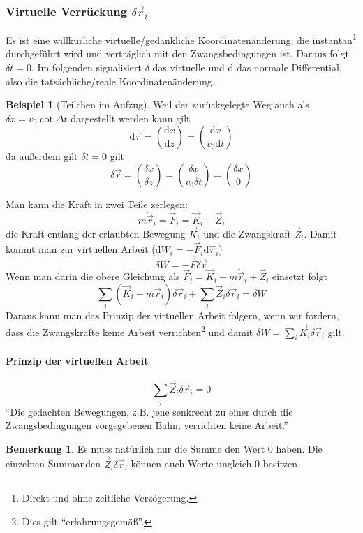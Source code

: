 \documentclass[oneside]{book}
\theoremstyle{definition}
\newtheorem*{bemerkung*}{Bemerkung}
\newtheorem*{beispiel*}{Beispiel}
\newcommand{\conseq}{$\rightarrow$~}
\renewcommand{\d}{\mathrm d}
\newcommand{\rvec}{\vec{r}}
\newcommand{\ddotvec}[1]{\ddot{\vec{#1}}}
\begin{document}

\subsubsection{Virtuelle Verrückung $\delta \vec{r}_i$} Es ist eine willkürliche virtuelle/gedankliche Koordinatenänderung, die instantan\footnote{Direkt und ohne zeitliche Verzögerung.} durchgeführt wird und verträglich mit den Zwangsbedingungen ist. Daraus folgt $\delta t = 0$. Im folgenden signalisiert $\delta$ das virtuelle und $\d$ das normale Differential, also die tatsächliche/reale Koordinatenänderung.

\begin{beispiel*}[Teilchen im Aufzug]
Weil der zurückgelegte Weg auch als $\delta x = v_0 \cot \Delta t$ dargestellt werden kann gilt
$$\d \vec{r} = \binom{\d x}{\d z} = \binom{\d x}{ v_0 \d t}$$
da außerdem gilt $\delta t = 0$ gilt
$$\delta \vec{r} = \binom{\delta x}{\delta z} = \binom{\delta x}{v_0 \delta t} = \binom{\delta x}{0}$$
\end{beispiel*}
Man kann die Kraft in zwei Teile zerlegen:
$$m \ddotvec{r}_i = \vec{F}_i = \vec{K}_i + \vec{Z}_i$$
die Kraft entlang der erlaubten Bewegung $\vec{K}_i$ und die Zwangskraft $\vec{Z}_i$. Damit kommt man zur virtuellen Arbeit ($\d W_i = - \vec{F}_i \d \vec{r}_i$)
$$\delta W = - \vec{F} \delta \vec{r}$$
Wenn man darin die obere Gleichung als $\vec{F}_i = \vec{K}_i - m \ddotvec{r}_i + \vec{Z}_i$ einsetzt folgt
$$\sum_i (\vec{K}_i - m \ddot{\vec{r}}_i) \delta \vec{r}_i + \sum_i \vec{Z}_i \delta \vec{r}_i = \delta W$$
Daraus kann man das Prinzip der virtuellen Arbeit folgern, wenn wir fordern, dass die Zwangskräfte keine Arbeit verrichten\footnote{Dies gilt "`erfahrungsgemäß"'.} und damit $\delta W = \sum_i \vec{K}_i \delta \rvec_i$ gilt.

\paragraph{Prinzip der virtuellen Arbeit}
$$\sum_i \vec{Z}_i \delta \vec{r}_i = 0$$
"`Die gedachten Bewegungen, z.B. jene senkrecht zu einer durch die Zwangsbedingungen vorgegebenen Bahn, verrichten keine Arbeit."'

\begin{bemerkung*}
	Es muss natürlich nur die Summe den Wert 0 haben. Die einzelnen Summanden $\vec{Z}_i \delta \rvec_i$ können auch Werte ungleich 0 besitzen.
\end{bemerkung*}
\end{document}
